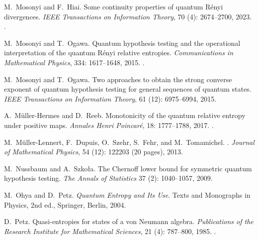 \documentclass[12pt]{article}
\theoremstyle{definition}
\theoremstyle{remark}
\numberwithin{equation}{section}
\begin{document}
\begin{thebibliography}{27}
M.~Mosonyi and F.~Hiai.
\newblock Some continuity properties of quantum {R}ényi divergences.
\newblock \emph{IEEE Transactions on Information Theory}, 70 (4):
2674--2700, 2023.
\newblock {}.

M.~Mosonyi and T.~Ogawa.
\newblock Quantum hypothesis testing and the operational interpretation of the quantum
R\'enyi relative entropies.
\newblock \emph{Communications in Mathematical Physics}, 334: 1617--1648, 2015.
\newblock {}.

M.~Mosonyi and T.~Ogawa.
\newblock Two approaches to obtain the strong converse exponent of quantum
hypothesis testing for general sequences of quantum states.
\newblock \emph{IEEE Transactions on Information Theory}, 61 (12):
6975--6994, 2015.

A.~M{\"u}ller-Hermes and D.~Reeb.
\newblock Monotonicity of the quantum relative entropy under positive maps.
\newblock \emph{Annales Henri Poincar{\'e}}, 18: 1777--1788, 2017.
\newblock {}.

M.~M{\" u}ller-Lennert, F.~Dupuis, O.~Szehr, S.~Fehr, and M.~Tomamichel.
.
\newblock \emph{Journal of Mathematical Physics}, {54} (12):
{122203} (20 pages), {2013}.

M.~Nussbaum and A.~Szko{\l}a.
\newblock The Chernoff lower bound for symmetric quantum hypothesis testing.
\newblock \emph{The Annals of Statistics} 37 (2): 1040--1057, 2009.

M.~Ohya and D.~Petz.
\newblock \emph{Quantum Entropy and Its Use}.
\newblock Texts and Monographs in Physics, 2nd ed., Springer, Berlin, 2004.

D.~Petz.
\newblock Quasi-entropies for states of a von {N}eumann algebra.
\newblock \emph{Publications of the Research Institute for Mathematical
  Sciences}, 21 (4): 787--800, 1985.
\newblock {}.


\end{thebibliography}
\end{document}
